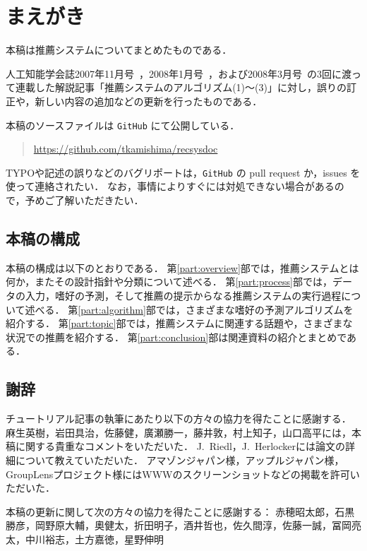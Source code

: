 \chapter*{まえがき}
\label{chap:preface}

本稿は推薦システムについてまとめたものである．

人工知能学会誌2007年11月号~\cite{jpublist:076}，2008年1月号~\cite{jpublist:081}，および2008年3月号~\cite{jpublist:083}の3回に渡って連載した解説記事「推薦システムのアルゴリズム(1)〜(3)」に対し，誤りの訂正や，新しい内容の追加などの更新を行ったものである．

本稿のソースファイルは \texttt{GitHub} にて公開している．
\begin{quote}
\url{https://github.com/tkamishima/recsysdoc}
\end{quote}
TYPOや記述の誤りなどのバグリポートは，\texttt{GitHub} の pull request か，issues を使って連絡されたい．
なお，事情によりすぐには対処できない場合があるので，予めご了解いただきたい．

\section*{本稿の構成}
\label{sec:preface:organization}

本稿の構成は以下のとおりである．
第\ref{part:overview}部では，推薦システムとは何か，またその設計指針や分類について述べる．
第\ref{part:process}部では，データの入力，嗜好の予測，そして推薦の提示からなる推薦システムの実行過程について述べる．
第\ref{part:algorithm}部では，さまざまな嗜好の予測アルゴリズムを紹介する．
第\ref{part:topic}部では，推薦システムに関連する話題や，さまざまな状況での推薦を紹介する．
第\ref{part:conclusion}部は関連資料の紹介とまとめである．

\section*{謝辞}
\label{sec:preface:ack}

チュートリアル記事の執筆にあたり以下の方々の協力を得たことに感謝する．
麻生英樹，岩田具治，佐藤健，廣瀬勝一，藤井敦，村上知子，山口高平には，本稿に関する貴重なコメントをいただいた．
J.~Riedl，J.~Herlockerには論文の詳細について教えていただいた．
アマゾンジャパン様，アップルジャパン様，GroupLensプロジェクト様にはWWWのスクリーンショットなどの掲載を許可いただいた．

本稿の更新に関して次の方々の協力を得たことに感謝する：
赤穂昭太郎，石黒勝彦，岡野原大輔，奧健太，折田明子，酒井哲也，佐久間淳，佐藤一誠，冨岡亮太，中川裕志，土方嘉徳，星野伸明
